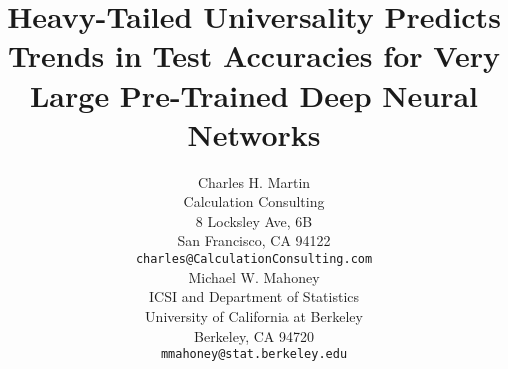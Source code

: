 \documentclass{article}
\title{Heavy-Tailed Universality Predicts Trends in Test Accuracies for Very Large Pre-Trained Deep Neural Networks}
\author{%
  Charles H. Martin \\
  Calculation Consulting \\
  8 Locksley Ave, 6B \\
  San Francisco, CA 94122 \\
  \texttt{charles@CalculationConsulting.com} \\
  \And
  Michael W. Mahoney \\
  ICSI and Department of Statistics \\
  University of California at Berkeley \\
  Berkeley, CA 94720 \\
  \texttt{mmahoney@stat.berkeley.edu} \\
}
\begin{document}
\maketitle







\newpage

%

{\small
%
%

}

\appendix
\newpage


\end{document}
